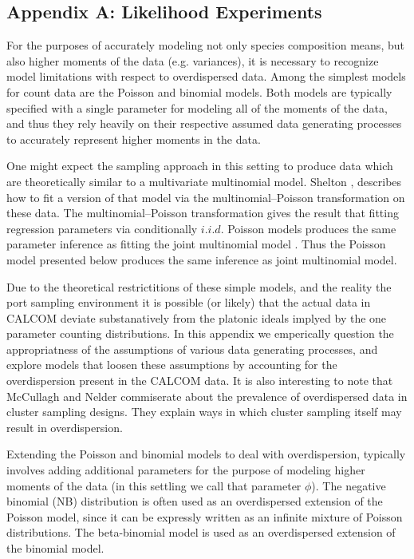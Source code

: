 \documentclass[12pt]{article}
\begin{document}
%
\subsection{Appendix A: Likelihood Experiments}\label{likelihoodAppendix}

%
For the purposes of accurately modeling not only species composition means, 
but also higher moments of the data (e.g. variances), it is necessary to 
recognize model limitations with respect to overdispersed data. Among the 
simplest models for count data are the Poisson and binomial models. Both 
models are typically specified with a single parameter for modeling all of the 
moments of the data, and thus they rely heavily on their respective assumed 
data generating processes to accurately represent higher moments in the data. 

%
One might expect the sampling approach in this setting to produce data which 
are theoretically similar to a multivariate multinomial model. Shelton 
\citeyear{shelton_estimating_2012}, describes how to fit a version of that 
model via the multinomial–Poisson transformation on these data. The 
multinomial–Poisson transformation gives the result that fitting regression 
parameters via conditionally $i.i.d.$ Poisson models produces the same 
parameter inference as fitting the joint multinomial model \cite{baker1994}.
Thus the Poisson model presented below produces the same inference as joint 
multinomial model. 

%
Due to the theoretical restrictitions of these simple models, and the reality 
the port sampling environment it is possible (or likely) that the actual data
in CALCOM deviate substanatively from the platonic ideals implyed by the one 
parameter counting distributions. In this appendix we emperically question 
the appropriatness of the assumptions of various data generating processes, and 
explore models that loosen these assumptions by accounting for the overdispersion 
present in the CALCOM data. It is also interesting to note that McCullagh and Nelder 
\citeyear{nelder_generalized_1989} %
commiserate about the prevalence of overdispersed data in cluster sampling designs. 
They explain ways in which cluster sampling itself may result in overdispersion.
  
%
Extending the Poisson and binomial models to deal with overdispersion, 
typically involves adding additional parameters for the purpose of modeling 
higher moments of the data (in this settling we call that parameter $\phi$). 
The negative binomial (NB) distribution is often used as an overdispersed 
extension of the Poisson model, since it can be expressly written as an 
infinite mixture of Poisson distributions. The beta-binomial model is used as 
an overdispersed extension of the binomial model.  
\end{document}
